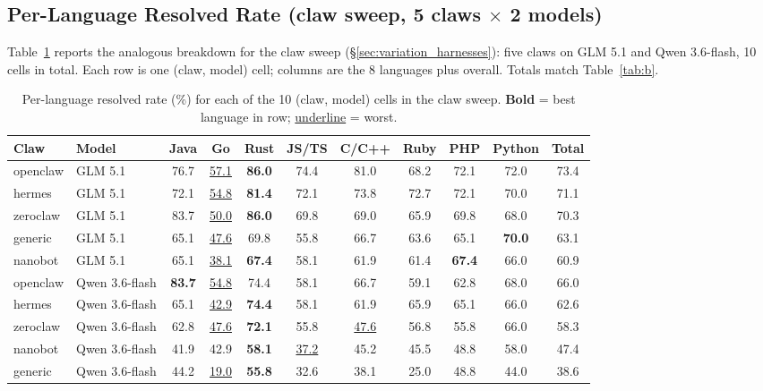\subsection{Per-Language Resolved Rate (claw sweep, 5 claws $\times$ 2 models)}
\label{appendix:per-repo:g2}

Table~\ref{tab:appG-per-lang-B} reports the analogous breakdown for the claw
sweep (\S\ref{sec:variation_harnesses}): five claws on GLM 5.1 and
Qwen 3.6-flash, 10 cells in total. Each row is one (claw, model) cell; columns
are the 8 languages plus overall. Totals match Table~\ref{tab:b}.

\begin{table}[h]
\centering
\small
\caption{Per-language resolved rate (\%) for each of the 10 (claw, model) cells
in the claw sweep. \textbf{Bold} = best language in row;
\underline{underline} = worst.}
\label{tab:appG-per-lang-B}
\begin{tabular}{llcccccccc|c}
\toprule
Claw & Model & Java & Go & Rust & JS/TS & C/C++ & Ruby & PHP & Python & Total \\
\midrule
openclaw & GLM 5.1        & 76.7          & \underline{57.1} & \textbf{86.0} & 74.4 & 81.0 & 68.2 & 72.1 & 72.0 & 73.4 \\
hermes   & GLM 5.1        & 72.1          & \underline{54.8} & \textbf{81.4} & 72.1 & 73.8 & 72.7 & 72.1 & 70.0 & 71.1 \\
zeroclaw & GLM 5.1        & 83.7          & \underline{50.0} & \textbf{86.0} & 69.8 & 69.0 & 65.9 & 69.8 & 68.0 & 70.3 \\
generic  & GLM 5.1        & 65.1          & \underline{47.6} & 69.8          & 55.8 & 66.7 & 63.6 & 65.1 & \textbf{70.0} & 63.1 \\
nanobot  & GLM 5.1        & 65.1          & \underline{38.1} & \textbf{67.4} & 58.1 & 61.9 & 61.4 & \textbf{67.4} & 66.0 & 60.9 \\
\midrule
openclaw & Qwen 3.6-flash & \textbf{83.7} & \underline{54.8} & 74.4          & 58.1 & 66.7 & 59.1 & 62.8 & 68.0 & 66.0 \\
hermes   & Qwen 3.6-flash & 65.1          & \underline{42.9} & \textbf{74.4} & 58.1 & 61.9 & 65.9 & 65.1 & 66.0 & 62.6 \\
zeroclaw & Qwen 3.6-flash & 62.8          & \underline{47.6} & \textbf{72.1} & 55.8 & \underline{47.6} & 56.8 & 55.8 & 66.0 & 58.3 \\
nanobot  & Qwen 3.6-flash & 41.9          & 42.9             & \textbf{58.1} & \underline{37.2} & 45.2 & 45.5 & 48.8 & 58.0 & 47.4 \\
generic  & Qwen 3.6-flash & 44.2          & \underline{19.0} & \textbf{55.8} & 32.6 & 38.1 & 25.0 & 48.8 & 44.0 & 38.6 \\
\bottomrule
\end{tabular}
\end{table}

